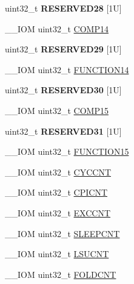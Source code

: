 \begin{DoxyCompactItemize}
\mbox{\label{struct_d_w_t___type_a2b357b17d47a4d526f6b26c6891c21da}} 
uint32\+\_\+t {\bfseries R\+E\+S\+E\+R\+V\+E\+D28} \mbox{[}1\+U\mbox{]}
\item 
\+\_\+\+\_\+\+I\+OM uint32\+\_\+t \mbox{\hyperlink{struct_d_w_t___type_a85368a4ec78f4074e5f9cbba92ae1eb9}{C\+O\+M\+P14}}
\item 
\mbox{\label{struct_d_w_t___type_af577b10077e677307bb79df1597141ca}} 
uint32\+\_\+t {\bfseries R\+E\+S\+E\+R\+V\+E\+D29} \mbox{[}1\+U\mbox{]}
\item 
\+\_\+\+\_\+\+I\+OM uint32\+\_\+t \mbox{\hyperlink{struct_d_w_t___type_a85138a411459f923ea8e05312d70af71}{F\+U\+N\+C\+T\+I\+O\+N14}}
\item 
\mbox{\label{struct_d_w_t___type_a212676fc2527b4b4f80155cb14171b4e}} 
uint32\+\_\+t {\bfseries R\+E\+S\+E\+R\+V\+E\+D30} \mbox{[}1\+U\mbox{]}
\item 
\+\_\+\+\_\+\+I\+OM uint32\+\_\+t \mbox{\hyperlink{struct_d_w_t___type_aa46b44e5aacd3ca3937741f423ab480f}{C\+O\+M\+P15}}
\item 
\mbox{\label{struct_d_w_t___type_aa46da05899a3c47a80b0ab33fc85f21a}} 
uint32\+\_\+t {\bfseries R\+E\+S\+E\+R\+V\+E\+D31} \mbox{[}1\+U\mbox{]}
\item 
\+\_\+\+\_\+\+I\+OM uint32\+\_\+t \mbox{\hyperlink{struct_d_w_t___type_a6e5fda09de44dfcd3e177c16028ceb74}{F\+U\+N\+C\+T\+I\+O\+N15}}
\item 
\+\_\+\+\_\+\+I\+OM uint32\+\_\+t \mbox{\hyperlink{struct_d_w_t___type_a102eaa529d9098242851cb57c52b42d9}{C\+Y\+C\+C\+NT}}
\item 
\+\_\+\+\_\+\+I\+OM uint32\+\_\+t \mbox{\hyperlink{struct_d_w_t___type_a2c08096c82abe245c0fa97badc458154}{C\+P\+I\+C\+NT}}
\item 
\+\_\+\+\_\+\+I\+OM uint32\+\_\+t \mbox{\hyperlink{struct_d_w_t___type_a9fe20c16c5167ca61486caf6832686d1}{E\+X\+C\+C\+NT}}
\item 
\+\_\+\+\_\+\+I\+OM uint32\+\_\+t \mbox{\hyperlink{struct_d_w_t___type_a416a54e2084ce66e5ca74f152a5ecc70}{S\+L\+E\+E\+P\+C\+NT}}
\item 
\+\_\+\+\_\+\+I\+OM uint32\+\_\+t \mbox{\hyperlink{struct_d_w_t___type_acc05d89bdb1b4fe2fa499920ec02d0b1}{L\+S\+U\+C\+NT}}
\item 
\+\_\+\+\_\+\+I\+OM uint32\+\_\+t \mbox{\hyperlink{struct_d_w_t___type_a1cfc48384ebd8fd8fb7e5d955aae6c97}{F\+O\+L\+D\+C\+NT}}

\end{DoxyCompactItemize}
